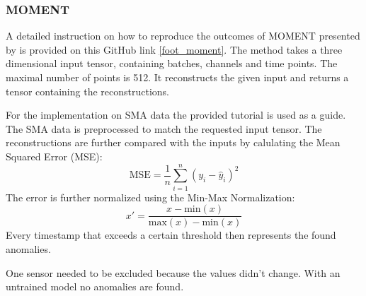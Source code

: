 \subsubsection{MOMENT}
A detailed instruction on how to reproduce the outcomes of MOMENT presented by \cite{goswami_moment_2024} is provided on this GitHub link \ref{foot_moment}. The method takes a three dimensional input tensor, containing batches, channels and time points. The maximal number of points is 512. It reconstructs the given input and returns a tensor containing the reconstructions.

For the implementation on SMA data the provided tutorial is used as a guide. The SMA data is preprocessed to match the requested input tensor. The reconstructions are further compared with the inputs by calulating the Mean Squared Error (MSE):
\begin{equation}
    \text{MSE} = \frac{1}{n} \sum_{i=1}^{n} \left( y_i - \hat{y}_i \right)^2
\end{equation}
The error is further normalized using the Min-Max Normalization:
\begin{equation}
x' = \frac{x - \text{min}(x)}{\text{max}(x) - \text{min}(x)}
\end{equation}
Every timestamp that exceeds a certain threshold then represents the found anomalies.

One sensor needed to be excluded because the values didn't change.
With an untrained model no anomalies are found.
